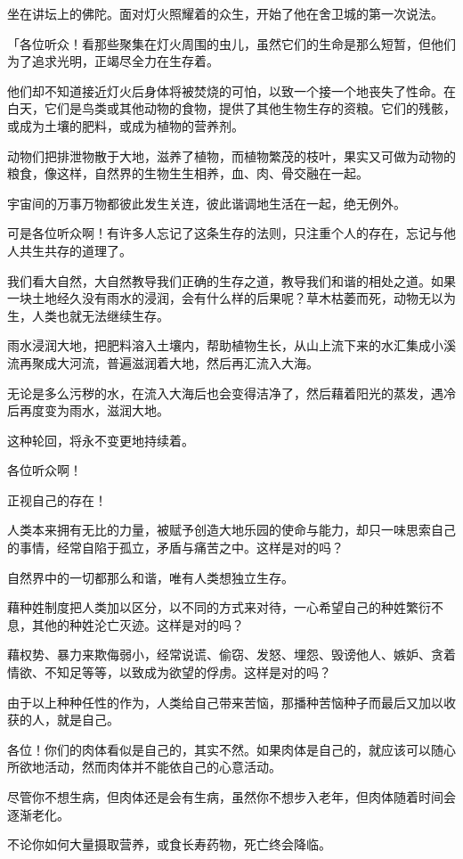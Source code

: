 \documentclass[twoside,openany]{book}
\begin{document}
坐在讲坛上的佛陀。面对灯火照耀着的众生，开始了他在舍卫城的第一次说法。

「各位听众！看那些聚集在灯火周围的虫儿，虽然它们的生命是那么短暂，但他们为了追求光明，正竭尽全力在生存着。

他们却不知道接近灯火后身体将被焚烧的可怕，以致一个接一个地丧失了性命。在白天，它们是鸟类或其他动物的食物，提供了其他生物生存的资粮。它们的残骸，或成为土壤的肥料，或成为植物的营养剂。

动物们把排泄物散于大地，滋养了植物，而植物繁茂的枝叶，果实又可做为动物的粮食，像这样，自然界的生物生生相养，血、肉、骨交融在一起。

宇宙间的万事万物都彼此发生关连，彼此谐调地生活在一起，绝无例外。

可是各位听众啊！有许多人忘记了这条生存的法则，只注重个人的存在，忘记与他人共生共存的道理了。

我们看大自然，大自然教导我们正确的生存之道，教导我们和谐的相处之道。如果一块土地经久没有雨水的浸润，会有什么样的后果呢？草木枯萎而死，动物无以为生，人类也就无法继续生存。

雨水浸润大地，把肥料溶入土壤内，帮助植物生长，从山上流下来的水汇集成小溪流再聚成大河流，普遍滋润着大地，然后再汇流入大海。

无论是多么污秽的水，在流入大海后也会变得洁净了，然后藉着阳光的蒸发，遇冷后再度变为雨水，滋润大地。

这种轮回，将永不变更地持续着。

各位听众啊！

正视自己的存在！

人类本来拥有无比的力量，被赋予创造大地乐园的使命与能力，却只一味思索自己的事情，经常自陷于孤立，矛盾与痛苦之中。这样是对的吗？

自然界中的一切都那么和谐，唯有人类想独立生存。

藉种姓制度把人类加以区分，以不同的方式来对待，一心希望自己的种姓繁衍不息，其他的种姓沦亡灭迹。这样是对的吗？

藉权势、暴力来欺侮弱小，经常说谎、偷窃、发怒、埋怨、毁谤他人、嫉妒、贪着情欲、不知足等等，以致成为欲望的俘虏。这样是对的吗？

由于以上种种任性的作为，人类给自己带来苦恼，那播种苦恼种子而最后又加以收获的人，就是自己。

各位！你们的肉体看似是自己的，其实不然。如果肉体是自己的，就应该可以随心所欲地活动，然而肉体并不能依自己的心意活动。

尽管你不想生病，但肉体还是会有生病，虽然你不想步入老年，但肉体随着时间会逐渐老化。

不论你如何大量摄取营养，或食长寿药物，死亡终会降临。
\end{document}
